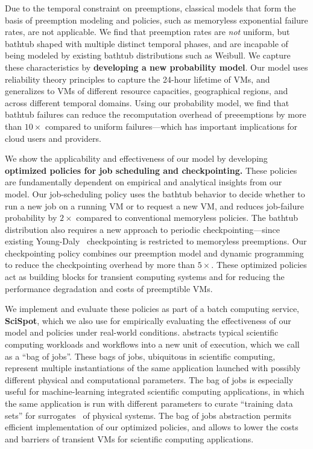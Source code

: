 %
Due to the temporal constraint on preemptions, classical models that form the basis of preemption modeling and policies, such as memoryless exponential failure rates, are not applicable. 
%
We find that preemption rates are \emph{not} uniform, but bathtub shaped with multiple distinct temporal phases, and are incapable of being modeled by existing bathtub distributions such as Weibull.
%
We capture these characteristics by \textbf{developing a new probability model}. 
Our model uses reliability theory principles to capture the 24-hour lifetime of VMs, and generalizes to VMs of different resource capacities, geographical regions, and across different temporal domains.
%
Using our probability model, we find that bathtub failures can reduce the recomputation overhead of preeemptions by more than  $10\times$ compared to uniform failures---which has important implications for cloud users and providers. 


We show the applicability and effectiveness of our model by developing \textbf{optimized policies for job scheduling and checkpointing.} 
These policies are fundamentally dependent on empirical and analytical insights from our model. %
%
Our job-scheduling policy uses the bathtub behavior to decide whether to run a new job on a running VM or to request a new VM, and reduces job-failure probability by $2\times$ compared to  conventional memoryless policies. 
%
The bathtub distribution also requires a new approach to periodic checkpointing---since existing Young-Daly~\cite{daly2006higher} checkpointing is restricted to memoryless preemptions. 
%
Our checkpointing policy combines our preemption model and dynamic programming to reduce the checkpointing overhead by more than $5\times$. 
%
These optimized policies act as building blocks for transient computing systems and for reducing the performance degradation and costs of preemptible VMs. 


We implement and evaluate these policies as part of a batch computing service, \textbf{SciSpot}, which we also use for empirically evaluating the effectiveness of our model and policies under real-world conditions. 
%
\sysname abstracts typical scientific computing workloads and workflows into a new unit of execution, which we call as a ``bag of jobs''. 
These bags of jobs, ubiquitous in scientific computing, represent multiple instantiations of the same application launched with possibly different physical and computational parameters.
The bag of jobs is especially useful for machine-learning integrated scientific computing applications, in which the same application is run with different parameters to curate ``training data sets'' for surrogates~\cite{} of physical systems. 
The bag of jobs abstraction permits efficient implementation of our optimized policies, and allows \sysname to lower the costs and barriers of transient VMs for scientific computing applications.


